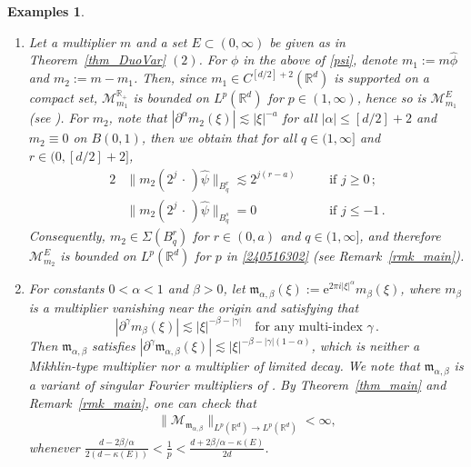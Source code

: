 \documentclass[11pt]{amsart}
\theoremstyle{plain}
\newtheorem*{example}{Examples}
\theoremstyle{definition}
\theoremstyle{remark}
\numberwithin{equation}{section}
\newcommand{\cM}{\mathcal{M}}
\newcommand{\bR}{\mathbb{R}}
\begin{document}
\begin{example}\,

\begin{enumerate}
    \item Let a multiplier $m$ and a set $E\subset (0,\infty)$ be given as in Theorem~\ref{thm_DuoVar} $(2)$.
    For $\phi$ in the above of \eqref{psi}, denote $m_1:=m\widehat{\phi}$ and $m_2:=m-m_1$.
    Then, since $m_1\in C^{[d/2]+2}(\bR^d)$ is supported on a compact set, $\cM_{m_1}^{\bR_+}$ is bounded on $L^p(\bR^d)$ for $p\in(1,\infty)$, hence so is $\cM_{m_1}^{E}$ (see \cite[Corollary 1.2]{LeeSeo_2023}).
    For $m_2$, note that $|\partial^\alpha m_2(\xi)|\lesssim |\xi|^{-a}$ for all $|\alpha|\leq [d/2]+2$ and $m_2\equiv 0$ on $B(0,1)$, then we obtain that for all $q\in(1,\infty]$ and $r\in (0,[d/2]+2]$,
    \begin{alignat*}{2}
    &\|m_2(2^j\,\cdot\,)\widehat{\psi}\|_{B_{q}^r}\lesssim 2^{j(r-a)}\quad &&\text{if $j\geq 0$}\,;\\
    &\|m_2(2^j\,\cdot\,)\widehat{\psi}\|_{B_{q}^s}=0\quad &&\text{if $j\leq -1$}\,.
    \end{alignat*}
    Consequently, $m_2\in \Sigma(B_{q}^r)$ for $r\in(0,a)$ and $q\in (1,\infty]$, and therefore $\cM_{m_2}^E$ is bounded on $L^p(\bR^d)$ for $p$ in \eqref{240516302} (see Remark~\ref{rmk_main}).
    
    

    \item For constants $0<\alpha<1$ and $\beta>0$, 
    let $\mathfrak{m}_{\alpha,\beta} (\xi):= \mathrm{e}^{2\pi i |\xi|^\alpha} m_\beta(\xi)$, where $m_\beta$ is a multiplier vanishing near the origin and satisfying that
    $$
    \left|\partial^\gamma m_\beta(\xi)\right|\lesssim |\xi|^{-\beta-|\gamma|}\quad\text{for any multi-index $\gamma$}\,.
    $$
    Then $\mathfrak{m}_{\alpha,\beta}$ satisfies $|\partial^\gamma \mathfrak{m}_{\alpha, \beta}(\xi)| \lesssim |\xi|^{-\beta-|\gamma|(1-\alpha)}$, which is neither a Mikhlin-type multiplier nor a multiplier of limited decay.
    We note that $\mathfrak{m}_{\alpha,\beta}$ is a variant of singular Fourier multipliers of \cite{Mi1980}.
    By Theorem~\ref{thm_main} and Remark~\ref{rmk_main}, one can check that
    \begin{align}\label{ineq_240405}
        \|\mathcal{M}_{\mathfrak{m}_{\alpha, \beta}} \|_{L^p(\bR^d) \to L^p(\bR^d)}<\infty,
    \end{align}
    whenever $\frac{d-2\beta/\alpha}{2(d-\kappa(E))}<\frac{1}{p}<\frac{d+2\beta/\alpha - \kappa(E)}{2d}$.


\end{enumerate}
\end{example}
\end{document}
